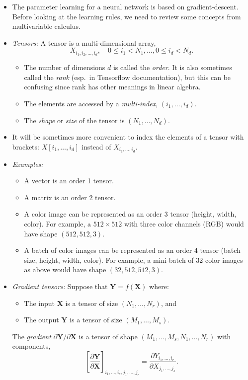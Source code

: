 \documentclass[11pt]{article}
\newcommand{\Xbf}{\mathbf{X}}
\newcommand{\Ybf}{\mathbf{Y}}
\begin{document}
\begin{itemize}
\item The parameter learning for a neural network is based on gradient-descent.
Before looking at the learning rules, we need to review some concepts from
multivariable calculus.

\item \emph{Tensors:}  A tensor is a multi-dimensional array,
\[
    X_{i_1,i_2, \ldots, i_d}, \quad 0 \leq i_1 < N_1,\ldots,
    0 \leq i_d < N_d.
\]
\begin{itemize}
  \item The number of dimensions $d$ is called the \emph{order}.  It is also
  sometimes called the \emph{rank} (esp.\ in Tensorflow documentation), but this
  can be confusing since rank has other meanings in linear algebra.
  \item The elements are accessed by a \emph{multi-index}, $(i_1,\ldots,i_d)$.
  \item The \emph{shape} or \emph{size} of the tensor is $(N_1,\ldots,N_d)$.
\end{itemize}
\item It will be sometimes more convenient to index the elements of a tensor with brackets:
$X[i_1,\ldots,i_d]$ instead of $X_{i_1,\ldots,i_d}$.

\item \emph{Examples:}
\begin{itemize}
  \item A vector is an order 1 tensor.
  \item A matrix is an order 2 tensor.
  \item A color image can be represented as an order 3 tensor (height, width, color).
  For example, a $512 \times 512$ with three color channels (RGB) would have shape
  $(512,512,3)$.
  \item A batch of color images can be represented as an order 4 tensor
  (batch size, height, width, color).  For example, a mini-batch of 32 color images
  as above would have shape $(32,512,512,3)$.
\end{itemize}

\item \emph{Gradient tensors:}  Suppose that $\Ybf = f(\Xbf)$ where:
\begin{itemize}
  \item The input $\Xbf$ is a tensor of size $(N_1,\ldots,N_r)$, and
  \item The output $\Ybf$ is a tensor of size $(M_1,\ldots,M_s)$.
\end{itemize}
The \emph{gradient} $\partial \Ybf / \partial \Xbf$
is a tensor of shape $(M_1,\ldots,M_s,N_1,\ldots,N_r)$
with components,
\[
    \left[ \frac{\partial \Ybf}{\partial \Xbf} \right]_{i_1,\ldots, i_s,j_1,\ldots,j_r} =
        \frac{\partial Y_{i_1,\ldots,i_r}}{\partial X_{j_1,\ldots,j_s}}.
\]


\end{itemize}
\end{document}
